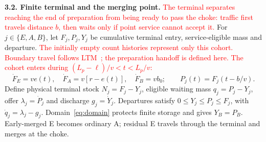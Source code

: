 \documentclass[10pt,a4paper]{article}
\newcommand{\rev}[1]{\textcolor{red}{#1}}
\begin{document}
\textbf{3.2. Finite terminal and the merging point.}
\rev{The terminal separates reaching the end of preparation from being
ready to pass the choke: traffic first travels distance $b$, then waits
only if point service cannot accept it.}
For $j\in\{E,A,B\}$, let $F_j,P_j,Y_j$ be cumulative terminal entry,
service-eligible mass and departure.
\rev{The initially empty count histories represent only this cohort.
Boundary travel follows LTM~\cite{jin}; the preparation handoff is defined
here. The cohort enters during $(L_p-\ell)/v<t<L_p/v$:}
\begin{equation}
 \dot F_E=ve(t),\quad \dot F_A=v[r-e(t)],\quad \dot F_B=vb_0;
 \qquad P_j(t)=F_j(t-b/v).
 \label{eq:arrivals}
\end{equation}
Define physical terminal stock $N_j=F_j-Y_j$, eligible waiting mass
$q_j=P_j-Y_j$, offer $\lambda_j=\dot P_j$ and discharge $g_j=\dot Y_j$.
Departures satisfy $0\leq Y_j\leq P_j\leq F_j$, with
$\dot q_j=\lambda_j-g_j$. Domain~\eqref{eq:domain} protects finite storage
and gives $Y_B=P_B$. Early-merged E becomes ordinary A; residual E travels
through the terminal and merges at the choke.
\end{document}
